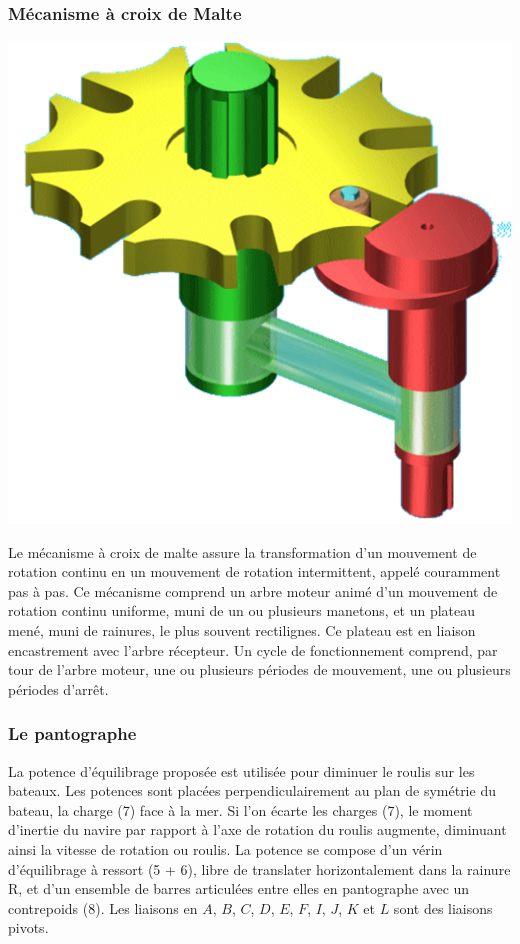 \documentclass[11pt,oneside]{article}
\begin{document}
\subsubsection{Mécanisme à croix de Malte}
\begin{minipage}[c]{.45\linewidth}
\begin{center}
\includegraphics[width=.8\textwidth]{png/fig_124}
\end{center}
\end{minipage}\hfill
\begin{minipage}[c]{.45\linewidth}
Le mécanisme à croix de malte assure la transformation d'un mouvement de rotation continu en un mouvement de rotation intermittent, appelé couramment pas à pas.
Ce mécanisme comprend un arbre moteur animé d'un mouvement de rotation continu uniforme, muni de un ou plusieurs manetons, et un plateau mené, muni de rainures, le plus souvent rectilignes. Ce plateau est en liaison encastrement avec l'arbre récepteur. Un cycle de fonctionnement comprend, par tour de l'arbre moteur, une ou plusieurs périodes de mouvement, une ou plusieurs périodes d'arrêt.

\end{minipage}
\subsubsection{Le pantographe}

La potence d'équilibrage proposée est utilisée pour diminuer le roulis sur les bateaux. Les potences sont placées perpendiculairement au plan de symétrie du bateau, la charge (7) face à la mer. Si l'on écarte les charges (7), le moment d'inertie du navire par rapport à l'axe de rotation du roulis augmente, diminuant ainsi la vitesse de rotation ou roulis.
La potence se compose d'un vérin d'équilibrage à ressort (5 + 6), libre de translater horizontalement dans la rainure R, et d'un ensemble de barres articulées entre elles en pantographe avec un contrepoids (8). Les liaisons en $A$, $B$, $C$, $D$, $E$, $F$, $I$, $J$, $K$ et $L$ sont des liaisons pivots.
\end{document}
